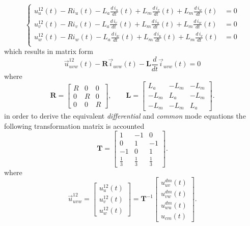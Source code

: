 \documentclass[11pt,a4paper]{scrartcl}
\numberwithin{equation}{section}
\theoremstyle{it}
\theoremstyle{definition}
\begin{document}
\begin{onehalfspace}
	\begin{equation}\left\lbrace 
		\begin{aligned}
			u_u^{12}(t) -R i_u(t) - L_a \frac{d\,i_u}{dt}(t) + L_m \frac{d\,i_v}{dt}(t) + L_m \frac{d\,i_w}{dt}(t) &= 0 \\[6pt]
			u_v^{12}(t) -R i_v(t) - L_a \frac{d\,i_v}{dt}(t) + L_m \frac{d\,i_u}{dt}(t) + L_m \frac{d\,i_w}{dt}(t) &= 0 \\[6pt]
			u_w^{12}(t) -R i_w(t) - L_a \frac{d\,i_w}{dt}(t) + L_m \frac{d\,i_u}{dt}(t) + L_m \frac{d\,i_v}{dt}(t) &= 0 \\[6pt]
		\end{aligned}\right. 
	\end{equation}
	which results in matrix form
	\begin{equation}
		\vec{u}_{uvw}^{12}(t) - \mathbf{R}\vec{i}_{uvw}(t) - \mathbf{L}\frac{d}{dt}\vec{i}_{uvw}(t) = 0
	\end{equation}
	where
	\begin{equation}
		\mathbf{R} = \begin{bmatrix} R & 0 & 0 \\ 0 & R & 0 \\ 0 & 0 & R \end{bmatrix}, \qquad 
		\mathbf{L} = \begin{bmatrix} L_a & -L_m & -L_m \\ -L_m & L_a & -L_m \\ -L_m & -L_m & L_a \end{bmatrix}.
	\end{equation}
	in order to derive the equivalent \textit{differential} and \textit{common} mode equations the following transformation matrix is accounted
	\begin{equation}
		\mathbf{T} = \begin{bmatrix} 1 & -1 & 0 \\ 0 & 1 & -1 \\ -1 & 0 & 1 \\ \frac{1}{3} & \frac{1}{3} & \frac{1}{3} \end{bmatrix}.
	\end{equation}
	where
	\begin{equation}
		\vec{u}_{uvw}^{12} = \begin{bmatrix} u^{12}_{u}(t) \\[6pt] u^{12}_{v}(t) \\[6pt] u^{12}_{w}(t) \end{bmatrix}= \mathbf{T}^{-1}\begin{bmatrix} u^{dm}_{uv}(t) \\[6pt] u^{dm}_{vw}(t) \\[6pt] u^{dm}_{wu}(t) \\[6pt] u_{cm}(t) \end{bmatrix}.

\end{equation}
\end{onehalfspace}
\end{document}

